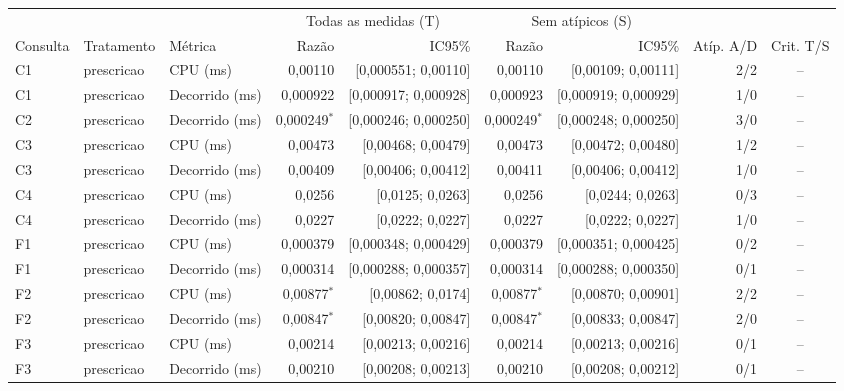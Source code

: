 {\scriptsize\setlength{\tabcolsep}{4pt}
\begin{tabular}{lllrrrrrc}
\toprule
 &  &  & \multicolumn{2}{c}{Todas as medidas (T)} & \multicolumn{2}{c}{Sem atípicos (S)} &  &  \\
\cmidrule(lr){4-5}\cmidrule(lr){6-7}
Consulta & Tratamento & Métrica & Razão & IC95\% & Razão & IC95\% & Atíp. A/D & Crit. T/S \\
\midrule
C1 & prescricao & CPU (ms) & 0,00110 & [0,000551; 0,00110] & 0,00110 & [0,00109; 0,00111] & 2/2 & -- \\
C1 & prescricao & Decorrido (ms) & 0,000922 & [0,000917; 0,000928] & 0,000923 & [0,000919; 0,000929] & 1/0 & -- \\
C2 & prescricao & Decorrido (ms) & 0,000249$^{*}$ & [0,000246; 0,000250] & 0,000249$^{*}$ & [0,000248; 0,000250] & 3/0 & -- \\
C3 & prescricao & CPU (ms) & 0,00473 & [0,00468; 0,00479] & 0,00473 & [0,00472; 0,00480] & 1/2 & -- \\
C3 & prescricao & Decorrido (ms) & 0,00409 & [0,00406; 0,00412] & 0,00411 & [0,00406; 0,00412] & 1/0 & -- \\
C4 & prescricao & CPU (ms) & 0,0256 & [0,0125; 0,0263] & 0,0256 & [0,0244; 0,0263] & 0/3 & -- \\
C4 & prescricao & Decorrido (ms) & 0,0227 & [0,0222; 0,0227] & 0,0227 & [0,0222; 0,0227] & 1/0 & -- \\
F1 & prescricao & CPU (ms) & 0,000379 & [0,000348; 0,000429] & 0,000379 & [0,000351; 0,000425] & 0/2 & -- \\
F1 & prescricao & Decorrido (ms) & 0,000314 & [0,000288; 0,000357] & 0,000314 & [0,000288; 0,000350] & 0/1 & -- \\
F2 & prescricao & CPU (ms) & 0,00877$^{*}$ & [0,00862; 0,0174] & 0,00877$^{*}$ & [0,00870; 0,00901] & 2/2 & -- \\
F2 & prescricao & Decorrido (ms) & 0,00847$^{*}$ & [0,00820; 0,00847] & 0,00847$^{*}$ & [0,00833; 0,00847] & 2/0 & -- \\
F3 & prescricao & CPU (ms) & 0,00214 & [0,00213; 0,00216] & 0,00214 & [0,00213; 0,00216] & 0/1 & -- \\
F3 & prescricao & Decorrido (ms) & 0,00210 & [0,00208; 0,00213] & 0,00210 & [0,00208; 0,00212] & 0/1 & -- \\

\end{tabular}}
